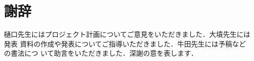 \documentclass[a4paper,titlepage,report,disablejfam]{jsbook}
\begin{document}
\section*{謝辞}
樋口先生にはプロジェクト計画についてご意見をいただきました．大墳先生には発表
資料の作成や発表についてご指導いただきました．牛田先生には予稿などの書法につ
いて助言をいただきました．深謝の意を表します．




\backmatter
\appendix
\end{document}
